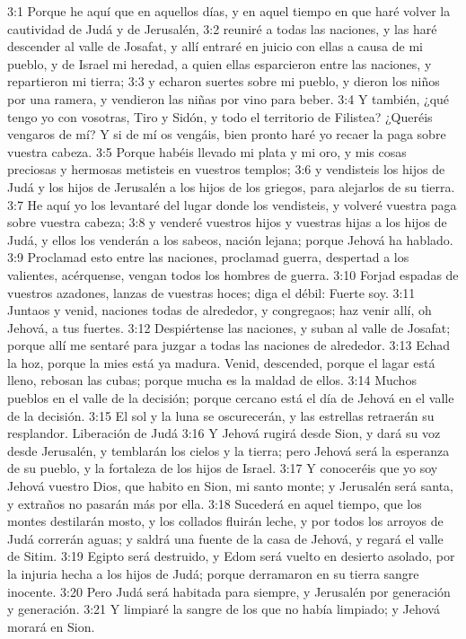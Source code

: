 3:1 Porque he aquí que en aquellos días, y en aquel tiempo en que haré volver la cautividad de Judá y de Jerusalén,  
3:2 reuniré a todas las naciones, y las haré descender al valle de Josafat, y allí entraré en juicio con ellas a causa de mi pueblo, y de Israel mi heredad, a quien ellas esparcieron entre las naciones, y repartieron mi tierra;  
3:3 y echaron suertes sobre mi pueblo, y dieron los niños por una ramera, y vendieron las niñas por vino para beber.  
3:4 Y también, ¿qué tengo yo con vosotras, Tiro y Sidón, y todo el territorio de Filistea? ¿Queréis vengaros de mí? Y si de mí os vengáis, bien pronto haré yo recaer la paga sobre vuestra cabeza.  
3:5 Porque habéis llevado mi plata y mi oro, y mis cosas preciosas y hermosas metisteis en vuestros templos;  
3:6 y vendisteis los hijos de Judá y los hijos de Jerusalén a los hijos de los griegos, para alejarlos de su tierra.  
3:7 He aquí yo los levantaré del lugar donde los vendisteis, y volveré vuestra paga sobre vuestra cabeza;  
3:8 y venderé vuestros hijos y vuestras hijas a los hijos de Judá, y ellos los venderán a los sabeos, nación lejana; porque Jehová ha hablado.  
3:9 Proclamad esto entre las naciones, proclamad guerra, despertad a los valientes, acérquense, vengan todos los hombres de guerra.  
3:10 Forjad espadas de vuestros azadones, lanzas de vuestras hoces; diga el débil: Fuerte soy.  
3:11 Juntaos y venid, naciones todas de alrededor, y congregaos; haz venir allí, oh Jehová, a tus fuertes.  
3:12 Despiértense las naciones, y suban al valle de Josafat; porque allí me sentaré para juzgar a todas las naciones de alrededor.  
3:13 Echad la hoz, porque la mies está ya madura. Venid, descended, porque el lagar está lleno, rebosan las cubas; porque mucha es la maldad de ellos.  
3:14 Muchos pueblos en el valle de la decisión; porque cercano está el día de Jehová en el valle de la decisión.  
3:15 El sol y la luna se oscurecerán, y las estrellas retraerán su resplandor.  
Liberación de Judá  
3:16 Y Jehová rugirá desde Sion, y dará su voz desde Jerusalén, y temblarán los cielos y la tierra; pero Jehová será la esperanza de su pueblo, y la fortaleza de los hijos de Israel.  
3:17 Y conoceréis que yo soy Jehová vuestro Dios, que habito en Sion, mi santo monte; y Jerusalén será santa, y extraños no pasarán más por ella.  
3:18 Sucederá en aquel tiempo, que los montes destilarán mosto, y los collados fluirán leche, y por todos los arroyos de Judá correrán aguas; y saldrá una fuente de la casa de Jehová, y regará el valle de Sitim.  
3:19 Egipto será destruido, y Edom será vuelto en desierto asolado, por la injuria hecha a los hijos de Judá; porque derramaron en su tierra sangre inocente.  
3:20 Pero Judá será habitada para siempre, y Jerusalén por generación y generación.  
3:21 Y limpiaré la sangre de los que no había limpiado; y Jehová morará en Sion.



